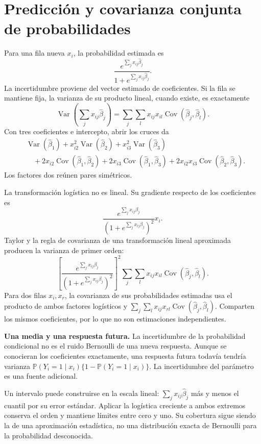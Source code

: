 \documentclass[11pt,a4paper]{article}
\newcommand{\Prob}{\mathbb P}
\DeclareMathOperator{\Var}{Var}
\DeclareMathOperator{\Cov}{Cov}
\begin{document}
\clearpage
\section{Predicción y covarianza conjunta de probabilidades}\label{logit64}
Para una fila nueva $x_i$, la probabilidad estimada es
\[
\frac{e^{\sum_jx_{ij}\widehat\beta_j}}
{1+e^{\sum_jx_{ij}\widehat\beta_j}}.
\]
La incertidumbre proviene del vector estimado de coeficientes.
Si la fila se mantiene fija, la varianza de su producto
lineal, cuando existe, es exactamente
\[
\Var\!\left(\sum_jx_{ij}\widehat\beta_j\right)
=\sum_j\sum_l x_{ij}x_{il}
\Cov(\widehat\beta_j,\widehat\beta_l).
\]
Con tres coeficientes e intercepto, abrir los cruces da
\[
\begin{aligned}
&\Var(\widehat\beta_1)+x_{i2}^2\Var(\widehat\beta_2)
+x_{i3}^2\Var(\widehat\beta_3)\\
&\quad+2x_{i2}\Cov(\widehat\beta_1,\widehat\beta_2)
+2x_{i3}\Cov(\widehat\beta_1,\widehat\beta_3)
+2x_{i2}x_{i3}\Cov(\widehat\beta_2,\widehat\beta_3).
\end{aligned}
\]
Los factores dos reúnen pares simétricos.

La transformación logística no es lineal.
Su gradiente respecto de los coeficientes es
\[
\frac{e^{\sum_jx_{ij}\beta_j}}
{(1+e^{\sum_jx_{ij}\beta_j})^2}x_i.
\]
Taylor y la regla de covarianza de una transformación
lineal aproximada producen la varianza de primer orden:
\[
\left[
\frac{e^{\sum_jx_{ij}\beta_j}}
{(1+e^{\sum_jx_{ij}\beta_j})^2}
\right]^2
\sum_j\sum_l x_{ij}x_{il}
\Cov(\widehat\beta_j,\widehat\beta_l).
\]
Para dos filas $x_i,x_r$, la covarianza de sus probabilidades
estimadas usa el producto de ambos factores logísticos y
$\sum_j\sum_l x_{ij}x_{rl}\Cov(\widehat\beta_j,\widehat\beta_l)$.
Comparten los mismos coeficientes, por lo que no son
estimaciones independientes.

\textbf{Una media y una respuesta futura.}
La incertidumbre de la probabilidad condicional no es
el ruido Bernoulli de una nueva respuesta.
Aunque se conocieran los coeficientes exactamente,
una respuesta futura todavía tendría varianza
$\Prob(Y_i=1\mid x_i)\{1-\Prob(Y_i=1\mid x_i)\}$.
La incertidumbre del parámetro es una fuente adicional.

Un intervalo puede construirse en la escala lineal:
$\sum_jx_{ij}\widehat\beta_j$ más y menos el cuantil
por su error estándar.
Aplicar la logística creciente a ambos extremos conserva
el orden y mantiene límites entre cero y uno.
Su cobertura sigue siendo la de una aproximación
estadística, no una distribución exacta de Bernoulli para
la probabilidad desconocida.
\end{document}

